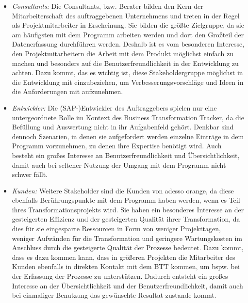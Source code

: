 \begin{itemize}
    \item[] \emph{Consultants:} Die Consultants, bzw. Berater bilden den Kern der Mitarbeiterschaft des auftraggebenen Unternehmens und treten in der Regel als Projektmitarbeiter in Erscheinung. Sie bilden die größte Zielgruppe, da sie am häufigsten mit dem Programm arbeiten werden und dort den Großteil der Datenerfassung durchführen werden. Deshalb ist es vom besonderen Interesse, den Projektmitarbeitern die Arbeit mit dem Produkt möglichst einfach zu machen und besonders auf die Benutzerfreundlichkeit in der Entwicklung zu achten. Dazu kommt, das es wichtig ist, diese Stakeholdergruppe möglichst in die Entwicklung mit einzubeziehen, um Verbesserungsvorschläge und Ideen in die Anforderungen mit aufzunehmen. 
    \item[] \emph{Entwickler:} Die (SAP-)Entwickler des Auftraggebers spielen nur eine untergeordnete Rolle im Kontext des Business Transformation Tracker, da die Befüllung und Auswertung nicht in ihr Aufgabenfeld gehört. Denkbar sind dennoch Szenarien, in denen sie aufgefordert werden einzelne Einträge in dem Programm vorzunehmen, zu denen ihre Expertise benötigt wird. Auch besteht ein großes Interesse an Benutzerfreundlichkeit und Übersichtlichkeit, damit auch bei seltener Nutzung der Umgang mit dem Programm nicht schwer fällt.
    \item[] \emph{Kunden:} Weitere Stakeholder sind die Kunden von adesso orange, da diese ebenfalls Berührungspunkte mit dem Programm haben werden, wenn es Teil ihres Transformationsprojekts wird. Sie haben ein besonderes Interesse an der gesteigerten Effizienz und der gesteigerten Qualität ihrer Transformation, da dies für sie eingesparte Ressourcen in Form von weniger Projekttagen, weniger Aufwänden für die Transformation und geringere Wartungskosten im Anschluss durch die gesteigerte Qualität der Prozesse bedeutet. Dazu kommt, dass es dazu kommen kann, dass in größeren Projekten die Mitarbeiter des Kunden ebenfalls in direkten Kontakt mit dem BTT kommen, um bspw. bei der Erfassung der Prozesse zu unterstützen. Dadurch entsteht ein großes Interesse an der Übersichtlichkeit und der Benutzerfreundlichkeit, damit auch bei einmaliger Benutzung das gewünschte Resultat zustande kommt.
\end{itemize}

